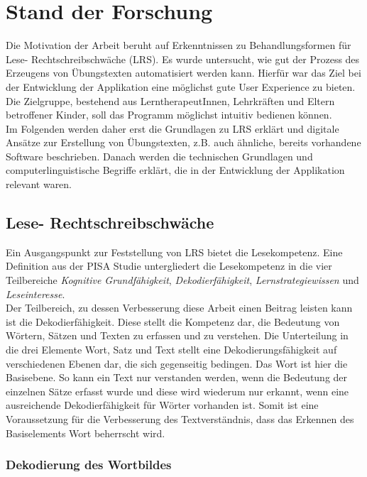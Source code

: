 
\chapter{Stand der Forschung}

Die Motivation der Arbeit beruht auf Erkenntnissen zu Behandlungsformen für Lese- Rechtschreibschwäche (LRS). Es wurde untersucht, wie gut der Prozess des Erzeugens von Übungstexten automatisiert werden kann. Hierfür war das Ziel bei der Entwicklung der Applikation eine möglichst gute User Experience zu bieten. Die Zielgruppe, bestehend aus LerntherapeutInnen, Lehrkräften und Eltern betroffener Kinder, soll das Programm möglichst intuitiv bedienen können.\\
Im Folgenden werden daher erst die Grundlagen zu LRS erklärt und digitale Ansätze zur Erstellung von Übungstexten, z.B. auch ähnliche, bereits vorhandene Software beschrieben. Danach werden die technischen Grundlagen und computerlinguistische Begriffe erklärt, die in der Entwicklung der Applikation relevant waren.

\section{Lese- Rechtschreibschwäche}

Ein Ausgangspunkt zur Feststellung von LRS bietet die Lesekompetenz. Eine Definition aus der PISA Studie untergliedert die Lesekompetenz in die vier Teilbereiche \textit{Kognitive Grundfähigkeit}, \textit{Dekodierfähigkeit}, \textit{Lernstrategiewissen} und \textit{Leseinteresse}\cite{Schulte-Koerne2014}.\\
Der Teilbereich, zu dessen Verbesserung diese Arbeit einen Beitrag leisten kann ist die Dekodierfähigkeit. Diese stellt die Kompetenz dar, die Bedeutung von Wörtern, Sätzen und Texten zu erfassen und zu verstehen. Die Unterteilung in die drei Elemente Wort, Satz und Text stellt eine Dekodierungsfähigkeit auf verschiedenen Ebenen dar, die sich gegenseitig bedingen. Das Wort ist hier die Basisebene. So kann ein Text nur verstanden werden, wenn die Bedeutung der einzelnen Sätze erfasst wurde und diese wird wiederum nur erkannt, wenn eine ausreichende Dekodierfähigkeit für Wörter vorhanden ist. Somit ist eine Voraussetzung für die Verbesserung des Textverständnis, dass das Erkennen des Basiselements Wort beherrscht wird.

\subsection{Dekodierung des Wortbildes}
\label{sec:dekodierung}

